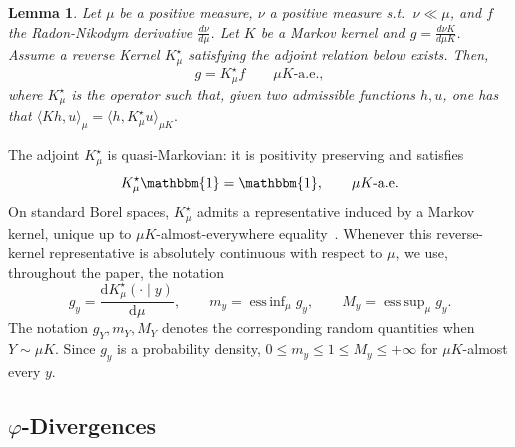\documentclass[11pt]{article}
\DeclareMathOperator*{\esssup}{ess\,sup}
\DeclareMathOperator*{\essinf}{ess\,inf}
\theoremstyle{plain}
\newtheorem{lemma}[theorem]{Lemma}
\theoremstyle{remark}
\begin{document}
\begin{lemma}\label{lem:kStarRND}
    Let $\mu$ be a positive measure, $\nu$ a positive measure s.t.\ $\nu\ll\mu$, and $f$ the Radon-Nikodym derivative   $\frac{d\nu}{d\mu}$. Let $K$ be a Markov kernel and $g=\frac{d\nu K}{d\mu K}$. Assume a reverse Kernel $K_\mu^\star$ satisfying the adjoint relation below exists. Then, %
  \begin{equation}
        g = K_\mu^\star f\hspace{2em} \mu K\text{-a.e.},
    \end{equation}
    where $K_\mu^\star$ is the operator such that, given two admissible functions $h,u$, one has that
    $\langle Kh, u \rangle_\mu = \langle h, K_\mu^\star u\rangle_{\mu K}.$
    \end{lemma}
   The adjoint $K_\mu^\star$ is quasi-Markovian: it is positivity
preserving and satisfies
\[
    K_\mu^\star \mathbbm{1}=\mathbbm{1},
    \qquad \mu K\text{-a.e.}
\]
On standard Borel spaces, $K_\mu^\star$ admits a representative induced by a Markov kernel, unique up to $\mu K$-almost-everywhere equality~\cite[Section 2, Lemma 2.2]{contractionLedoux}.
Whenever this reverse-kernel representative is absolutely continuous with respect to $\mu$, we use, throughout the paper, the notation
\begin{equation}
    g_y
    =
    \frac{\mathrm dK_\mu^\star(\cdot\mid y)}{\mathrm d\mu},
    \qquad
    m_y
    =
    \essinf_{\mu} g_y,
    \qquad
    M_y
    =
    \esssup_{\mu} g_y.
    \label{eq:reverseKernelDensityEndpoints}
\end{equation}
The notation $g_Y,m_Y,M_Y$ denotes the corresponding random quantities when $Y\sim\mu K$. Since $g_y$ is a probability density, $0\leq m_y\leq1\leq M_y\leq+\infty$ for $\mu K$-almost every $y$.
\subsection{$\varphi$-Divergences}
\end{document}
